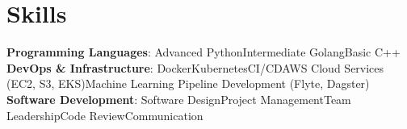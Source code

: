 

\sectionsep



\section{Skills}

\textbf{Programming Languages}: Advanced Python\inlinespace Intermediate Golang\inlinespace Basic C++ \\[6pt]

\textbf{DevOps \& Infrastructure}: Docker\inlinespace Kubernetes\inlinespace CI/CD\inlinespace AWS Cloud Services (EC2, S3, EKS)\inlinespace Machine Learning Pipeline Development (Flyte, Dagster) \\[6pt]

\textbf{Software Development}: Software Design\inlinespace Project Management\inlinespace Team Leadership\inlinespace Code Review\inlinespace Communication
